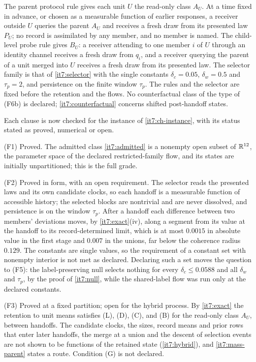 \documentclass[11pt,letterpaper]{report}
\begin{document}
The parent protocol rule gives each unit $U$ the read-only class $A_U$. At a time fixed in advance, or chosen as a measurable function of earlier responses, a receiver outside $U$ queries the parent $A_U$ and receives a fresh draw from its presented law $P_U$; no record is assimilated by any member, and no member is named. The child-level probe rule gives $B_U$: a receiver attending to one member $i$ of $U$ through an identity channel receives a fresh draw from $q_i$, and a receiver querying the parent of a unit merged into $U$ receives a fresh draw from its presented law. The selector family is that of \cref{it7:selector} with the single constants $\delta_c=0.05$, $\delta_w=0.5$ and $\tau_p=2$, and persistence on the finite window $\tau_p$. The rules and the selector are fixed before the retention and the flows. No counterfactual class of the type of (F6b) is declared; \cref{it7:counterfactual} concerns shifted post-handoff states.

Each clause is now checked for the instance of \cref{it7:ch-instance}, with its status stated as proved, numerical or open.

(F1) Proved. The admitted class \cref{it7:admitted} is a nonempty open subset of $\mathbb R^{12}$, the parameter space of the declared restricted-family flow, and its states are initially unpartitioned; this is the full grade.

(F2) Proved in form, with an open requirement. The selector reads the presented laws and its own candidate clocks, so each handoff is a measurable function of accessible history; the selected blocks are nontrivial and are never dissolved, and persistence is on the window $\tau_p$. After a handoff each difference between two members' deviations moves, by \cref{it7:exact}(iv), along a segment from its value at the handoff to its record-determined limit, which is at most $0.0015$ in absolute value in the first stage and $0.007$ in the unions, far below the coherence radius $0.129$. The constants are single values, so the requirement of a constant set with nonempty interior is not met as declared. Declaring such a set moves the question to (F5): the label-preserving null selects nothing for every $\delta_c\le0.0588$ and all $\delta_w$ and $\tau_p$, by the proof of \cref{it7:null}, while the shared-label flow was run only at the declared constants.

(F3) Proved at a fixed partition; open for the hybrid process. By \cref{it7:exact} the retention to unit means satisfies (L), (D), (C), and (B) for the read-only class $A_U$, between handoffs. The candidate clocks, the sizes, record means and prior rows that enter later handoffs, the merge at a union and the descent of selection events are not shown to be functions of the retained state (\cref{it7:hybrid}), and \cref{it7:mass-parent} states a route. Condition (G) is not declared.
\end{document}
